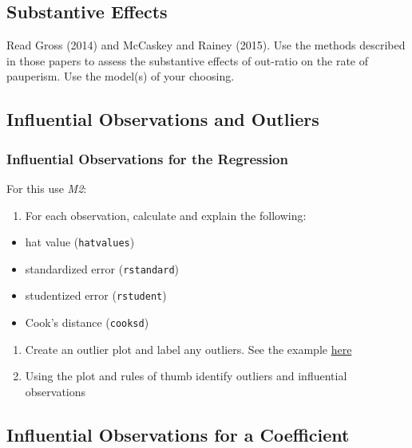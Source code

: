 \documentclass[]{article}
\providecommand{\tightlist}{%
  \setlength{\itemsep}{0pt}\setlength{\parskip}{0pt}}
\begin{document}
\subsection{Substantive Effects}\label{substantive-effects}

Read Gross (2014) and McCaskey and Rainey (2015). Use the methods
described in those papers to assess the substantive effects of out-ratio
on the rate of pauperism. Use the model(s) of your choosing.

\subsection{Influential Observations and
Outliers}\label{influential-observations-and-outliers}

\subsubsection{Influential Observations for the
Regression}\label{influential-observations-for-the-regression}

For this use \emph{M2}:

\begin{enumerate}
\def\labelenumi{\arabic{enumi}.}
\tightlist
\item
  For each observation, calculate and explain the following:
\end{enumerate}

\begin{itemize}
\tightlist
\item
  hat value (\texttt{hatvalues})
\item
  standardized error (\texttt{rstandard})
\item
  studentized error (\texttt{rstudent})
\item
  Cook's distance (\texttt{cooksd})
\end{itemize}

\begin{enumerate}
\def\labelenumi{\arabic{enumi}.}
\setcounter{enumi}{1}
\tightlist
\item
  Create an outlier plot and label any outliers. See the example
  \href{https://jrnold.github.io/intro-methods-notes/outliers.html\#iver-and-soskice-data}{here}
\item
  Using the plot and rules of thumb identify outliers and influential
  observations
\end{enumerate}

\subsection{Influential Observations for a
Coefficient}\label{influential-observations-for-a-coefficient}
\end{document}
